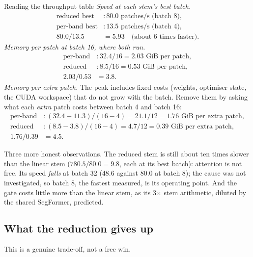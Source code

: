 \begin{worked}[label={we:specdecoder:readtable}]{Reading the throughput table}
\emph{Speed at each stem's best batch.}
\begin{align*}
  \text{reduced best}&: 80.0 \text{ patches/s (batch 8)},\\
  \text{per-band best}&: 13.5 \text{ patches/s (batch 4)},\\
  80.0/13.5 &= 5.93 \quad\text{(about 6 times faster)}.
\end{align*}
\emph{Memory per patch at batch 16, where both run.}
\begin{align*}
  \text{per-band}&: 32.4/16 = 2.03 \text{ GiB per patch},\\
  \text{reduced}&: 8.5/16 = 0.53 \text{ GiB per patch},\\
  2.03/0.53 &= 3.8 .
\end{align*}
\emph{Memory per extra patch.} The peak includes fixed costs (weights, optimiser state, the CUDA workspace) that do not grow with the batch. Remove them by asking what each \emph{extra} patch costs between batch 4 and batch 16:
\begin{align*}
  \text{per-band}&: (32.4 - 11.3)/(16 - 4) = 21.1/12 = 1.76 \text{ GiB per extra patch},\\
  \text{reduced}&: (8.5 - 3.8)/(16 - 4) = 4.7/12 = 0.39 \text{ GiB per extra patch},\\
  1.76/0.39 &= 4.5 .
\end{align*}
\end{worked}

Three more honest observations. The reduced stem is still about ten times slower than the linear stem ($780.5/80.0 = 9.8$, each at its best batch): attention is not free. Its speed \emph{falls} at batch 32 (48.6 against 80.0 at batch 8); the cause was not investigated, so batch 8, the fastest measured, is its operating point. And the gate costs little more than the linear stem, as its 3$\times$ stem arithmetic, diluted by the shared SegFormer, predicted.

\subsection{What the reduction gives up}

This is a genuine trade-off, not a free win.

